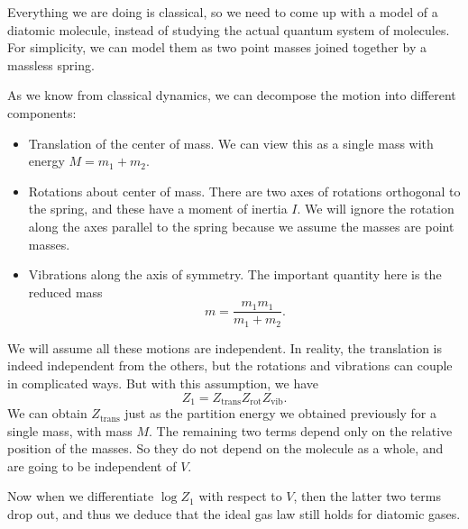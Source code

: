 \documentclass[a4paper]{article}
\begin{document}
Everything we are doing is classical, so we need to come up with a model of a diatomic molecule, instead of studying the actual quantum system of molecules. For simplicity, we can model them as two point masses joined together by a massless spring.
\begin{center}
\end{center}
As we know from classical dynamics, we can decompose the motion into different components:
\begin{itemize}
  \item Translation of the center of mass. We can view this as a single mass with energy $M = m_1 + m_2$.
  \item Rotations about center of mass. There are two axes of rotations orthogonal to the spring, and these have a moment of inertia $I$. We will ignore the rotation along the axes parallel to the spring because we assume the masses are point masses.
  \item Vibrations along the axis of symmetry. The important quantity here is the reduced mass
    \[
      m = \frac{m_1 m_1}{m_1 + m_2}.
    \]
\end{itemize}
We will assume all these motions are independent. In reality, the translation is indeed independent from the others, but the rotations and vibrations can couple in complicated ways. But with this assumption, we have
\[
  Z_1 = Z_{\mathrm{trans}} Z_{\mathrm{rot}} Z_{\mathrm{vib}}.
\]
We can obtain $Z_{\mathrm{trans}}$ just as the partition energy we obtained previously for a single mass, with mass $M$. The remaining two terms depend only on the relative position of the masses. So they do not depend on the molecule as a whole, and are going to be independent of $V$.

Now when we differentiate $\log Z_1$ with respect to $V$, then the latter two terms drop out, and thus we deduce that the ideal gas law still holds for diatomic gases.
\end{document}
